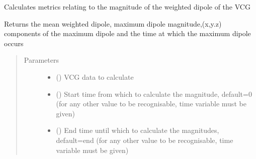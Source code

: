 \documentclass[letterpaper,10pt,english]{sphinxmanual}
\begin{document}
\begin{fulllineitems}
\label{\detokenize{_autosummary/signalanalysis.vcg.get_dipole_magnitudes:signalanalysis.vcg.get_dipole_magnitudes}}
\sphinxAtStartPar
Calculates metrics relating to the magnitude of the weighted dipole of the VCG

\sphinxAtStartPar
Returns the mean weighted dipole, maximum dipole magnitude,(x,y.z) components of the maximum dipole and the time
at which the maximum dipole occurs
\begin{quote}\begin{description}
\item[{Parameters}] \leavevmode\begin{itemize}
\item {} 
\sphinxAtStartPar
{} () \textendash{} VCG data to calculate

\item {} 
\sphinxAtStartPar
{} (\sphinxstyleliteralemphasis{\sphinxupquote{, }}) \textendash{} Start time from which to calculate the magnitude, default=0 (for any other value to be recognisable,
time variable must be given)

\item {} 
\sphinxAtStartPar
{} (\sphinxstyleliteralemphasis{\sphinxupquote{, }}) \textendash{} End time until which to calculate the magnitudes, default=end (for any other value to be recognisable,
time variable must be given)


\end{itemize}
\end{description}
\end{quote}
\end{fulllineitems}
\end{document}
